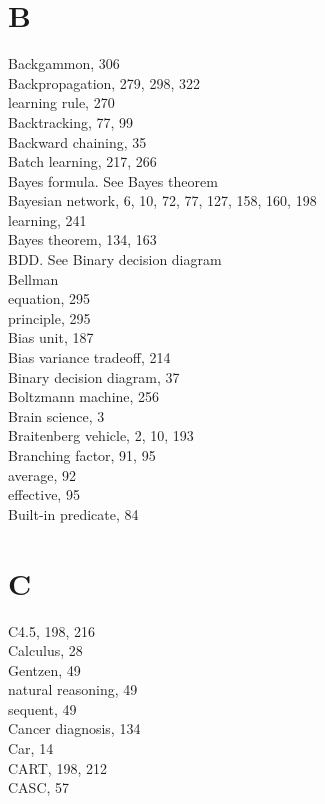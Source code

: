 \documentclass[10pt]{article}
\begin{document}
\section*{B}
Backgammon, 306\\
Backpropagation, 279, 298, 322\\
learning rule, 270\\
Backtracking, 77, 99\\
Backward chaining, 35\\
Batch learning, 217, 266\\
Bayes formula. See Bayes theorem\\
Bayesian network, 6, 10, 72, 77, 127, 158, 160, 198\\
learning, 241\\
Bayes theorem, 134, 163\\
BDD. See Binary decision diagram\\
Bellman\\
equation, 295\\
principle, 295\\
Bias unit, 187\\
Bias variance tradeoff, 214\\
Binary decision diagram, 37\\
Boltzmann machine, 256\\
Brain science, 3\\
Braitenberg vehicle, 2, 10, 193\\
Branching factor, 91, 95\\
average, 92\\
effective, 95\\
Built-in predicate, 84

\section*{C}
C4.5, 198, 216\\
Calculus, 28\\
Gentzen, 49\\
natural reasoning, 49\\
sequent, 49\\
Cancer diagnosis, 134\\
Car, 14\\
CART, 198, 212\\
CASC, 57
\end{document}
